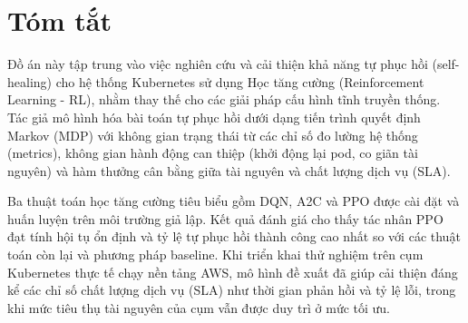 \chapter*{Tóm tắt}

Đồ án này tập trung vào việc nghiên cứu và cải thiện khả năng tự phục hồi (self-healing) cho hệ thống Kubernetes sử dụng Học tăng cường (Reinforcement Learning - RL), nhằm thay thế cho các giải pháp cấu hình tĩnh truyền thống. Tác giả mô hình hóa bài toán tự phục hồi dưới dạng tiến trình quyết định Markov (MDP) với không gian trạng thái từ các chỉ số đo lường hệ thống (metrics), không gian hành động can thiệp (khởi động lại pod, co giãn tài nguyên) và hàm thưởng cân bằng giữa tài nguyên và chất lượng dịch vụ (SLA). 

Ba thuật toán học tăng cường tiêu biểu gồm DQN, A2C và PPO được cài đặt và huấn luyện trên môi trường giả lập. Kết quả đánh giá cho thấy tác nhân PPO đạt tính hội tụ ổn định và tỷ lệ tự phục hồi thành công cao nhất so với các thuật toán còn lại và phương pháp baseline. Khi triển khai thử nghiệm trên cụm Kubernetes thực tế chạy nền tảng AWS, mô hình đề xuất đã giúp cải thiện đáng kể các chỉ số chất lượng dịch vụ (SLA) như thời gian phản hồi và tỷ lệ lỗi, trong khi mức tiêu thụ tài nguyên của cụm vẫn được duy trì ở mức tối ưu.
